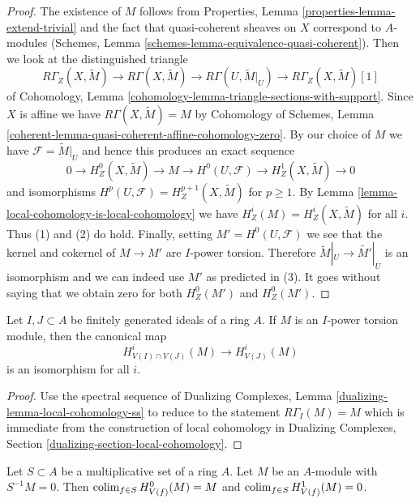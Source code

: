 \begin{proof}
The existence of $M$ follows from
Properties, Lemma \ref{properties-lemma-extend-trivial}
and the fact that quasi-coherent sheaves on $X$ correspond
to $A$-modules (Schemes, Lemma \ref{schemes-lemma-equivalence-quasi-coherent}).
Then we look at the distinguished triangle
$$
R\Gamma_Z(X, \widetilde{M}) \to R\Gamma(X, \widetilde{M}) \to
R\Gamma(U, \widetilde{M}|_U) \to R\Gamma_Z(X, \widetilde{M})[1]
$$
of Cohomology, Lemma \ref{cohomology-lemma-triangle-sections-with-support}.
Since $X$ is affine we have $R\Gamma(X, \widetilde{M}) = M$
by Cohomology of Schemes, Lemma
\ref{coherent-lemma-quasi-coherent-affine-cohomology-zero}.
By our choice of $M$ we have $\mathcal{F} = \widetilde{M}|_U$
and hence this produces an exact sequence
$$
0 \to H^0_Z(X, \widetilde{M}) \to M \to H^0(U, \mathcal{F}) \to
H^1_Z(X, \widetilde{M}) \to 0
$$
and isomorphisms $H^p(U, \mathcal{F}) = H^{p + 1}_Z(X, \widetilde{M})$
for $p \geq 1$. By Lemma \ref{lemma-local-cohomology-is-local-cohomology}
we have $H^i_Z(M) = H^i_Z(X, \widetilde{M})$ for all $i$.
Thus (1) and (2) do hold.
Finally, setting $M' = H^0(U, \mathcal{F})$ we see that
the kernel and cokernel of $M \to M'$ are $I$-power torsion.
Therefore $\widetilde{M}|_U \to \widetilde{M'}|_U$ is an isomorphism
and we can indeed use $M'$ as predicted in (3). It goes without saying
that we obtain zero for both $H^0_Z(M')$ and $H^0_Z(M')$.
\end{proof}

\begin{lemma}
\label{lemma-already-torsion}
Let $I, J \subset A$ be finitely generated ideals of a ring $A$.
If $M$ is an $I$-power torsion module, then the
canonical map
$$
H^i_{V(I) \cap V(J)}(M) \to H^i_{V(J)}(M)
$$
is an isomorphism for all $i$.
\end{lemma}

\begin{proof}
Use the spectral sequence of
Dualizing Complexes, Lemma \ref{dualizing-lemma-local-cohomology-ss}
to reduce to the statement $R\Gamma_I(M) = M$ which is immediate
from the construction of local cohomology
in Dualizing Complexes, Section \ref{dualizing-section-local-cohomology}.
\end{proof}

\begin{lemma}
\label{lemma-multiplicative}
Let $S \subset A$ be a multiplicative set of a ring $A$.
Let $M$ be an $A$-module with $S^{-1}M = 0$. Then
$\mathop{\mathrm{colim}}\nolimits_{f \in S} H^0_{V(f)}(M) = M$ and
$\mathop{\mathrm{colim}}\nolimits_{f \in S} H^1_{V(f)}(M) = 0$.
\end{lemma}

